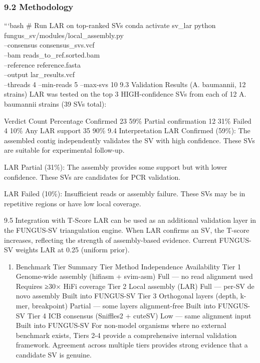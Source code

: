 \documentclass[
]{article}
\providecommand{\tightlist}{%
  \setlength{\itemsep}{0pt}\setlength{\parskip}{0pt}}
\begin{document}
\hypertarget{methodology-1}{%
\subsubsection{9.2 Methodology}\label{methodology-1}}

```bash \# Run LAR on top-ranked SVs conda activate sv\_lar python
fungus\_sv/modules/local\_assembly.py\\
--consensus consensus\_svs.vcf\\
--bam reads\_to\_ref.sorted.bam\\
--reference reference.fasta\\
--output lar\_results.vcf\\
--threads 4 --min-reads 5 --max-svs 10 9.3 Validation Results (A.
baumannii, 12 strains) LAR was tested on the top 3 HIGH-confidence SVs
from each of 12 A. baumannii strains (39 SVs total):

Verdict Count Percentage Confirmed 23 59\% Partial confirmation 12 31\%
Failed 4 10\% Any LAR support 35 90\% 9.4 Interpretation LAR Confirmed
(59\%): The assembled contig independently validates the SV with high
confidence. These SVs are suitable for experimental follow-up.

LAR Partial (31\%): The assembly provides some support but with lower
confidence. These SVs are candidates for PCR validation.

LAR Failed (10\%): Insufficient reads or assembly failure. These SVs may
be in repetitive regions or have low local coverage.

9.5 Integration with T-Score LAR can be used as an additional validation
layer in the FUNGUS-SV triangulation engine. When LAR confirms an SV,
the T-score increases, reflecting the strength of assembly-based
evidence. Current FUNGUS-SV weights LAR at 0.25 (uniform prior).

\begin{enumerate}
\def\labelenumi{\arabic{enumi}.}
\setcounter{enumi}{9}
\tightlist
\item
  Benchmark Tier Summary Tier Method Independence Availability Tier 1
  Genome-wide assembly (hifiasm + svim-asm) Full --- no read alignment
  used Requires ≥30× HiFi coverage Tier 2 Local assembly (LAR) Full ---
  per-SV de novo assembly Built into FUNGUS-SV Tier 3 Orthogonal layers
  (depth, k-mer, breakpoint) Partial --- some layers alignment-free
  Built into FUNGUS-SV Tier 4 ICB consensus (Sniffles2 + cuteSV) Low ---
  same alignment input Built into FUNGUS-SV For non-model organisms
  where no external benchmark exists, Tiers 2-4 provide a comprehensive
  internal validation framework. Agreement across multiple tiers
  provides strong evidence that a candidate SV is genuine.
\end{enumerate}
\end{document}
